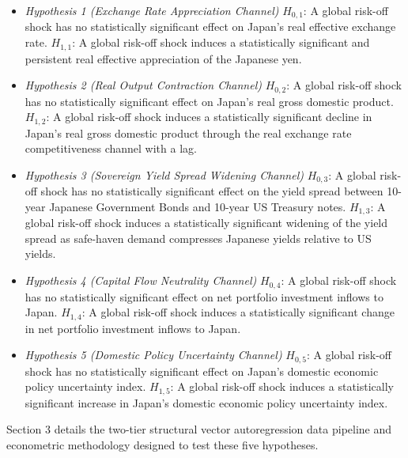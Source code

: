 \begin{itemize}
    \item \textit{Hypothesis 1 (Exchange Rate Appreciation Channel)}
\newline $H_{0,1}$: A global risk-off shock has no statistically significant effect on Japan's real effective exchange rate.
\newline $H_{1,1}$: A global risk-off shock induces a statistically significant and persistent real effective appreciation of the Japanese yen.

    \item \textit{Hypothesis 2 (Real Output Contraction Channel)}
\newline $H_{0,2}$: A global risk-off shock has no statistically significant effect on Japan's real gross domestic product.
\newline $H_{1,2}$: A global risk-off shock induces a statistically significant decline in Japan's real gross domestic product through the real exchange rate competitiveness channel with a lag.

    \item \textit{Hypothesis 3 (Sovereign Yield Spread Widening Channel)}
\newline $H_{0,3}$: A global risk-off shock has no statistically significant effect on the yield spread between 10-year Japanese Government Bonds and 10-year US Treasury notes.
\newline $H_{1,3}$: A global risk-off shock induces a statistically significant widening of the yield spread as safe-haven demand compresses Japanese yields relative to US yields.

    \item \textit{Hypothesis 4 (Capital Flow Neutrality Channel)}
\newline $H_{0,4}$: A global risk-off shock has no statistically significant effect on net portfolio investment inflows to Japan.
\newline $H_{1,4}$: A global risk-off shock induces a statistically significant change in net portfolio investment inflows to Japan.

    \item \textit{Hypothesis 5 (Domestic Policy Uncertainty Channel)}
\newline $H_{0,5}$: A global risk-off shock has no statistically significant effect on Japan's domestic economic policy uncertainty index.
\newline $H_{1,5}$: A global risk-off shock induces a statistically significant increase in Japan's domestic economic policy uncertainty index.
\end{itemize}

Section 3 details the two-tier structural vector autoregression data pipeline and econometric methodology designed to test these five hypotheses.
